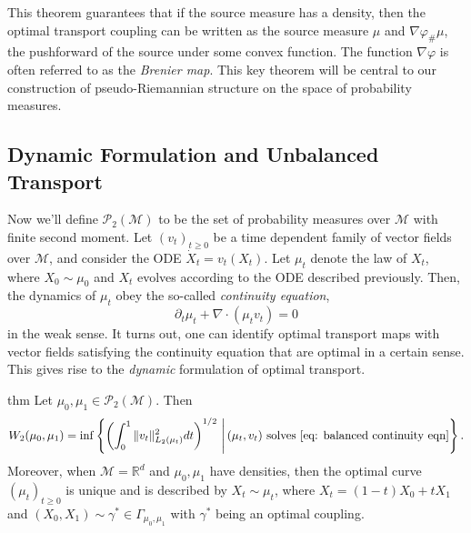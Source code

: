 \documentclass{article}
\newcommand{\man}{\mathcal{M}}
\begin{document}
This theorem guarantees that if the source measure has a density, then the optimal transport coupling can be written as the source measure $\mu$ and $\nabla \varphi_\#\mu$, the pushforward of the source under some convex function. The function $\nabla\varphi$ is often referred to as the \textit{Brenier map}. This key theorem will be central to our construction of pseudo-Riemannian structure on the space of probability measures. 

\subsection{Dynamic Formulation and Unbalanced Transport}

Now we'll define $\mathcal{P}_{2}(\man)$ to be the set of probability measures over $\man$ with finite second moment. Let $(v_t)_{t \geq 0}$ be a time dependent family of vector fields over $\man$, and consider the ODE $\dot X_t = v_t(X_t)$. Let $\mu_t$ denote the law of $X_t$, where $X_0 \sim \mu_0$ and $X_t$ evolves according to the ODE described previously. Then, the dynamics of $\mu_t$ obey the so-called \textit{continuity equation},
\begin{equation}
    \partial_t\mu_t + \nabla \cdot (\mu_t v_t) = 0 \label{eq: balanced continuity eqn}
\end{equation}
in the weak sense. It turns out, one can identify optimal transport maps with vector fields satisfying the continuity equation that are optimal in a certain sense. This gives rise to the \textit{dynamic} formulation of optimal transport.

\begin{restatable}{thm}{}
    Let $\mu_0, \mu_1 \in \mathcal{P}_{2}(\man)$. Then 
    \begin{equation*}
        W_2(\mu_0, \mu_1) = \inf \left\{\left(\int_{0}^1\|v_t\|^2_{L_2(\mu_t)} dt\right)^{1/2} \, \Bigg| \, (\mu_t, v_t) \text{ solves \cref{eq: balanced continuity eqn}}\right\}.
    \end{equation*}
    Moreover, when $\man = \mathbb{R}^d$ and $\mu_0, \mu_1$ have densities, then the optimal curve $(\mu_t)_{t\geq 0}$ is unique and is described by $X_t \sim \mu_t$, where $X_t = (1-t)X_0 + tX_1$ and $(X_0, X_1) \sim \gamma^* \in \Gamma_{\mu_0, \mu_1}$ with $\gamma^*$ being an optimal coupling.
\end{restatable}
\end{document}
